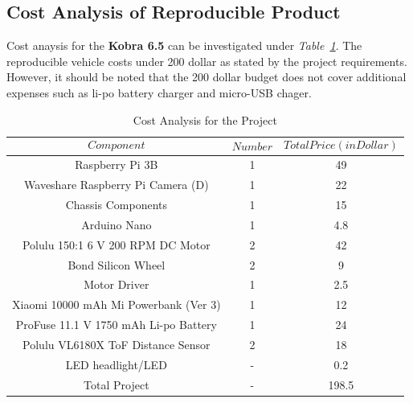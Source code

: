\documentclass[a4paper,12pt]{article}
\begin{document}
		
	\subsection{Cost Analysis of Reproducible Product}

	Cost anaysis for the \textbf{Kobra 6.5} can be investigated under \textit{Table~\ref{tab:cost}}. The reproducible vehicle costs under 200 dollar as stated by the project requirements. However, it should be noted that the 200 dollar budget does not cover additional expenses such as li-po battery charger and micro-USB chager.

	
	\begin{table}[H]
		\centering
		\caption{Cost Analysis for the Project}
			\begin{tabular}{c|c|c}
			$$Component$$ & $$Number$$ & $$Total Price (in Dollar)$$  \\ \hline
			Raspberry Pi 3B & 1 & 49   \\ \hline
			Waveshare Raspberry Pi Camera (D) & 1 & 22   \\ \hline
			Chassis Components & 1 & 15   \\ \hline
			Arduino Nano & 1 &  4.8 \\ \hline
			Polulu 150:1 6 V 200 RPM DC Motor & 2 & 42 \\ \hline
			Bond Silicon Wheel & 2 & 9 \\ \hline
			Motor Driver & 1 &  2.5 \\ \hline
			Xiaomi 10000 mAh Mi Powerbank (Ver 3) & 1 & 12 \\ \hline
			ProFuse 11.1 V 1750 mAh Li-po Battery  & 1 & 24 \\ \hline
			Polulu VL6180X ToF Distance Sensor & 2 & 18 \\ \hline
			LED headlight/LED & - & 0.2 \\ \hline
			Total Project & - & 198.5 
		\end{tabular} 
		\label{tab:cost}
	\end{table}

\end{document}
